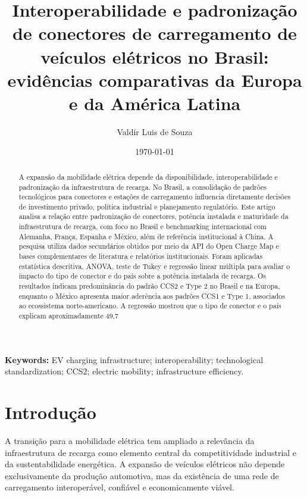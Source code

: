 \documentclass[12pt]{article}
\title{Interoperabilidade e padronização de conectores de carregamento de veículos elétricos no Brasil: evidências comparativas da Europa e da América Latina}
\author{Valdir Luis de Souza}
\date{\today}
\begin{document}
\maketitle

\begin{abstract}
A expansão da mobilidade elétrica depende da disponibilidade, interoperabilidade e padronização da infraestrutura de recarga. No Brasil, a consolidação de padrões tecnológicos para conectores e estações de carregamento influencia diretamente decisões de investimento privado, política industrial e planejamento regulatório. Este artigo analisa a relação entre padronização de conectores, potência instalada e maturidade da infraestrutura de recarga, com foco no Brasil e benchmarking internacional com Alemanha, França, Espanha e México, além de referência institucional à China. A pesquisa utiliza dados secundários obtidos por meio da API do Open Charge Map e bases complementares de literatura e relatórios institucionais. Foram aplicadas estatística descritiva, ANOVA, teste de Tukey e regressão linear múltipla para avaliar o impacto do tipo de conector e do país sobre a potência instalada de recarga. Os resultados indicam predominância do padrão CCS2 e Type 2 no Brasil e na Europa, enquanto o México apresenta maior aderência aos padrões CCS1 e Type 1, associados ao ecossistema norte-americano. A regressão mostrou que o tipo de conector e o país explicam aproximadamente 49,7%
\end{abstract}

\noindent\textbf{Keywords:} EV charging infrastructure; interoperability; technological standardization; CCS2; electric mobility; infrastructure efficiency.

\section{Introdução}
A transição para a mobilidade elétrica tem ampliado a relevância da infraestrutura de recarga como elemento central da competitividade industrial e da sustentabilidade energética. A expansão de veículos elétricos não depende exclusivamente da produção automotiva, mas da existência de uma rede de carregamento interoperável, confiável e economicamente viável. 
\end{document}
